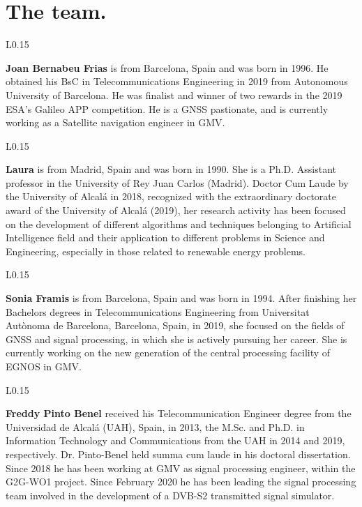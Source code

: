 
\section{The team.}
\begin{wrapfigure}{L}{0.15\textwidth}
    \end{wrapfigure}
\textbf{Joan Bernabeu Frias} is from Barcelona, Spain and was born in 1996. He obtained his BsC in Telecommunications Engineering in 2019 from Autonomous University of Barcelona. He was finalist and winner of two rewards in the 2019 ESA's Galileo APP competition. He is a GNSS pastionate, and is currently working as a Satellite navigation engineer in GMV.\\

\begin{wrapfigure}{L}{0.15\textwidth}
    \end{wrapfigure}
\textbf{Laura} is from Madrid, Spain and was born in 1990. She is a Ph.D. Assistant professor in the University of Rey Juan Carlos (Madrid). Doctor Cum Laude by the University of Alcalá in 2018, recognized with the extraordinary doctorate award of the University of Alcalá (2019), her research activity has been focused on the development of different algorithms and techniques belonging to Artificial Intelligence field and their application to different problems in Science and Engineering, especially in those related to renewable energy problems.\\

\begin{wrapfigure}{L}{0.15\textwidth}
    \end{wrapfigure}

\textbf{Sonia Framis} is from Barcelona, Spain and was born in 1994. After finishing her Bachelors degrees in Telecommunications Engineering from Universitat Autònoma de Barcelona, Barcelona, Spain, in 2019, she focused on the fields of GNSS and signal processing, in which she is actively pursuing her career. She is currently working on the new generation of the central processing facility of EGNOS in GMV.\\

\newpage
\begin{wrapfigure}{L}{0.15\textwidth}
    \end{wrapfigure}
\textbf{Freddy Pinto Benel} received his Telecommunication Engineer degree from the Universidad de Alcalá (UAH), Spain, in 2013, the M.Sc. and Ph.D. in Information Technology and Communications from the UAH in 2014 and 2019, respectively. Dr. Pinto-Benel held summa cum laude in his doctoral dissertation. Since 2018 he has been working at GMV as signal processing engineer, within the G2G-WO1 project. Since February 2020 he has been leading the signal processing team involved in the development of a DVB-S2 transmitted signal simulator.\\


